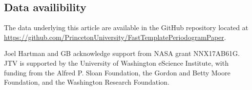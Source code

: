 \documentclass[apj]{emulateapj}
\begin{document}
\begin{appendix}
\section{Data availibility}
The data underlying this article are available in the GitHub repository located at \href{https://github.com/PrincetonUniversity/FastTemplatePeriodogramPaper}{https://github.com/PrincetonUniversity/FastTemplatePeriodogramPaper}.

\end{appendix}

\begin{acknowledgements}
    Joel Hartman and GB acknowledge support from NASA grant NNX17AB61G. JTV is supported by the University of Washington eScience Institute, with funding from the Alfred P. Sloan Foundation, the Gordon and Betty Moore Foundation, and the Washington Research Foundation.
\end{acknowledgements}



\end{document}
